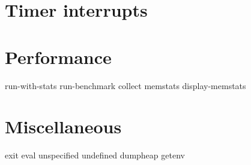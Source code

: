 
\section{Timer interrupts}


\section{Performance}

run-with-stats
run-benchmark
collect
memstats
display-memstats

\section{Miscellaneous}

exit
eval
unspecified
undefined
dumpheap
getenv


